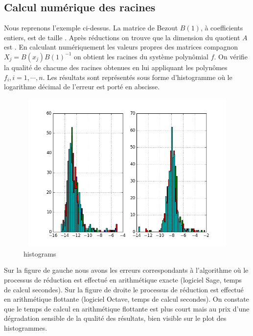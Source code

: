 \documentclass{standalone}
\begin{document}
  \subsection{Calcul numérique des racines}
  Nous reprenons l'exemple ci-dessus. La matrice de Bezout $B(1)$, à coefficients entiers, est de taille . Après réductions on trouve que la dimension du quotient $A$ est . En calculant numériquement les valeurs propres des matrices compagnon $X_j = B(x_j)B(1)^{-1}$ on obtient les racines du système polynômial $f$. On vérifie la qualité de chacune des racines obtenues en lui appliquant les polynômes $f_i, i=1,\cdots,n$. Les résultats sont représentés sous forme d'histogramme o\`u le logarithme décimal de l'erreur est porté en abscisse.
\begin{figure}[!ht]
    \caption{histograms}
  \includegraphics[height=8cm, width=1.2\textwidth]{../png/roots.png}
\end{figure}
Sur la figure de gauche nous avons les erreurs correspondants à l'algorithme o\`u le processus de réduction est effectué en arithmétique exacte (logiciel Sage, temps de calcul
 secondes). Sur la figure de droite le processus de réduction est effectué en arithmétique flottante (logiciel Octave, temps de calcul
 secondes). On constate que le temps de calcul en arithmétique flottante est plus court mais au prix d'une dégradation sensible de la qualité des résultats, bien visible sur le plot des histogrammes.
\end{document}
